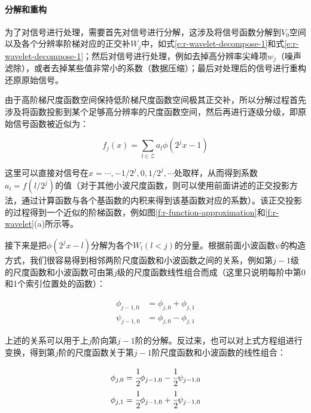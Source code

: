 \paragraph{分解和重构}
为了对信号进行处理，需要首先对信号进行分解，这涉及将信号函数分解到$V_0$空间以及各个分辨率阶梯对应的正交补$W_j$中，如式\ref{e:r-wavelet-decompose-1}和式\ref{e:r-wavelet-decompose-1}；然后对信号进行处理，例如去掉高分辨率尖峰项$w_j$（噪声滤除），或者去掉某些值非常小的系数（数据压缩）；最后对处理后的信号进行重构还原原始信号。

由于高阶梯尺度函数空间保持低阶梯尺度函数空间极其正交补，所以分解过程首先涉及将函数投影到某个足够高分辨率的尺度函数空间，然后再进行逐级分级，即原始信号函数被近似为：

\begin{equation}
	f_j(x)=\sum_{l\in\mathcal{Z}}a_l\phi(2^{j}x-1)
\end{equation}

\noindent 这里可以直接对信号在$x=\cdots,-1/2^{j},0,1/2^{j},\cdots$处取样，从而得到系数$a_l=f(l/2^{j})$的值（对于其他小波尺度函数，则可以使用前面讲述的正交投影方法，通过计算函数与各个基函数的内积来得到该基函数对应的系数）。该正交投影的过程得到一个近似的阶梯函数，例如图\ref{f:r-function-approximation}和\ref{f:r-wavelet}(a)所示等。

接下来是把$\phi(2^{j}x-l)$分解为各个$W_l(l<j)$的分量。根据前面小波函数$\psi$的构造方式，我们很容易得到相邻两阶尺度函数和小波函数之间的关系，例如第$j-1$级的尺度函数和小波函数可由第$j$级的尺度函数线性组合而成（这里只说明每阶中第0和1个索引位置处的函数）：

\begin{equation}\label{e:r-harr-decompose}
	\begin{aligned}
		\phi_{j-1,0}&=\phi_{j,0}+\phi_{j,1}\\
		\psi_{j-1,0}&=\phi_{j,0}-\phi_{j,1}
	\end{aligned}
\end{equation}

\noindent 上述的关系可以用于上$j$阶向第$j-1$阶的分解。反过来，也可以对上式方程组进行变换，得到第$j$阶的尺度函数关于第$j-1$阶尺度函数和小波函数的线性组合：

\begin{equation}\label{e:r-harr-reconstruction}
\begin{aligned}
	\phi_{j,0}&= \cfrac{1}{2}\phi_{j-1,0}- \cfrac{1}{2}\psi_{j-1,0}\\
	\phi_{j,1}&= \cfrac{1}{2}\phi_{j-1,0}+ \cfrac{1}{2}\psi_{j-1,0}
\end{aligned}
\end{equation}

